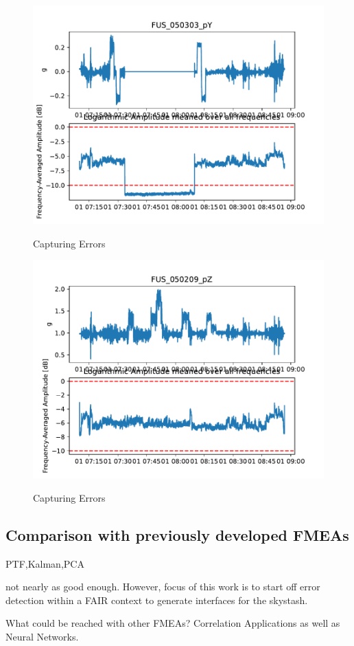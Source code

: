 \begin{figure}
    \centering
    \includegraphics[width=.7\textwidth]{03_figures/python_functions/images/FUS_050303}
    \label{fig:res_050303}
    \caption{Capturing Errors}
\end{figure}

\begin{figure}
    \centering
    \includegraphics[width=.7\textwidth]{03_figures/python_functions/images/FUS_050209}
    \label{fig:res_050209}
    \caption{Capturing Errors}
\end{figure}






\subsection{Comparison with previously developed FMEAs}
PTF,Kalman,PCA

not nearly as good enough. However, focus of this work is to start off error detection within a FAIR context to generate interfaces for the skystash.

What could be reached with other FMEAs? Correlation Applications as well as Neural Networks.



